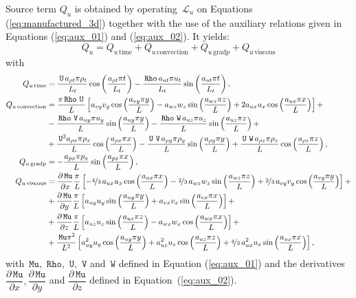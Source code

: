 \documentclass[10pt]{article}
\newcommand{\diff}[2] {\dfrac{\partial #1}{\partial #2}}
\newcommand{\Rho}{\,\mathtt{Rho}}
\newcommand{\U}{\,\mathtt{U}}
\newcommand{\V}{\,\mathtt{V}}
\newcommand{\W}{\,\mathtt{W}}
\newcommand{\Lo}{\,\mathcal{L}}
\newcommand{\Mu}{\,\mathtt{Mu}}
\newcommand{\DMuDx}{\diff{\Mu}{x}}
\newcommand{\DMuDy}{\diff{\Mu}{y}}
\newcommand{\DMuDz}{\diff{\Mu}{z}}
\newcommand{\convection}{\text{convection}}
\newcommand{\gradp}{\text{grad}p}
\newcommand{\viscous}{\text{viscous}}
\begin{document}
Source term $Q_u$ is obtained by operating $\Lo_{u}$ on Equations  (\ref{eq:manufactured_3d}) together with the use of the  auxiliary relations given in Equations (\ref{eq:aux_01}) and (\ref{eq:aux_02}). It yields:
\begin{equation*}
 \label{eq:ns1d_12}
Q_u = Q_{u \, \text{time}}+Q_{u \, \convection}+Q_{u \, \gradp }+Q_{u \, \viscous }
\end{equation*}
with
\begin{equation*}
 \begin{split}
 Q_{u \, \text{time}}&= 
\frac{ \U \, a_{\rho t} \pi\rho_{t} }{L_t}\cos\left(\frac{a_{\rho t} \pi t}{L_t}\right) - \frac{\Rho \, a_{ut} \pi u_{t} }{L_t}\sin\left(\frac{a_{ut} \pi t}{L_t}\right),\\
%
 Q_{u \, \text{convection}}&= 
\frac{\pi \Rho \, \U \, }{L} \left[a_{vy} v_{y}\cos\left(\frac{a_{vy} \pi y}{L}\right) - a_{wz} w_{z} \sin\left(\frac{a_{wz} \pi z}{L}\right) + 2 a_{ux} u_{x} \cos\left(\frac{a_{ux} \pi x}{L}\right)\right] + \\ 
&- \frac{ \Rho \, \V \, a_{uy} \pi u_{y} }{L}\sin\left(\frac{a_{uy} \pi y}{L}\right) - \frac{\Rho \, \W \, a_{uz} \pi u_{z} }{L} \sin\left(\frac{a_{uz} \pi z}{L}\right)+\\
&+ \frac{\U^{2} a_{\rho x} \pi \rho_{x} }{L}\cos\left(\frac{a_{\rho x} \pi x}{L}\right) - \frac{ \U \, \V \, a_{\rho y} \pi\rho_{y} }{L}\sin\left(\frac{a_{\rho y} \pi y}{L}\right)+ \frac{ \U \, \W \, a_{\rho z} \pi\rho_{z} }{L}\cos\left(\frac{a_{\rho z} \pi z}{L}\right) ,\\
%
Q_{u \, \text{gradp}}&= - \frac{a_{px} \pi p_{x} }{L}\sin\left(\frac{a_{px} \pi x}{L}\right), \\
%
Q_{u \, \text{viscous}}&= 
\DMuDx\frac{\pi }{L} \left[- \nicefrac{4}{3} \, a_{ux} u_{x} \cos\left(\frac{a_{ux} \pi x}{L}\right) - \nicefrac{2}{3} \, a_{wz} w_{z} \sin\left(\frac{a_{wz} \pi z}{L}\right) + \nicefrac{2}{3} \, a_{vy} v_{y} \cos\left(\frac{a_{vy} \pi y}{L}\right)\right] + \\ 
&+ \DMuDy\frac{\pi }{L} \left[a_{uy} u_{y} \sin\left(\frac{a_{uy} \pi y}{L}\right) + a_{vx} v_{x} \sin\left(\frac{a_{vx} \pi x}{L}\right)\right] + \\ 
&+ \DMuDz\frac{\pi }{L} \left[a_{uz} u_{z} \sin\left(\frac{a_{uz} \pi z}{L}\right) - a_{wx} w_{x} \cos\left(\frac{a_{wx} \pi x}{L}\right)\right] + \\ 
&+ \frac{\Mu \pi^{2} }{L^2} \left[a_{uy}^{2} u_{y} \cos\left(\frac{a_{uy} \pi y}{L}\right) + a_{uz}^{2} u_{z} \cos\left(\frac{a_{uz} \pi z}{L}\right) + \nicefrac{4}{3} \, a_{ux}^{2} u_{x} \sin\left(\frac{a_{ux} \pi x}{L}\right)\right],
 \end{split}
\end{equation*}
with $\Mu,\, \Rho,\,\U,\,\V$ and $\W$  defined in Equation (\ref{eq:aux_01}) and the derivatives $\DMuDx,\DMuDy$ and $\DMuDz$ defined in Equation~(\ref{eq:aux_02}).
\end{document}

